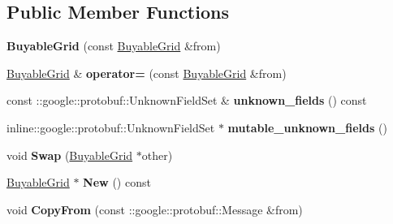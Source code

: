 \subsection*{Public Member Functions}
\begin{DoxyCompactItemize}
\item 
\hypertarget{classmonopoly_1_1_buyable_grid_a5460d03d099c969b65e1e1c5ed919adb}{}{\bfseries Buyable\+Grid} (const \hyperlink{classmonopoly_1_1_buyable_grid}{Buyable\+Grid} \&from)\label{classmonopoly_1_1_buyable_grid_a5460d03d099c969b65e1e1c5ed919adb}

\item 
\hypertarget{classmonopoly_1_1_buyable_grid_acb2e830d60bc5f46c25602a32eb85682}{}\hyperlink{classmonopoly_1_1_buyable_grid}{Buyable\+Grid} \& {\bfseries operator=} (const \hyperlink{classmonopoly_1_1_buyable_grid}{Buyable\+Grid} \&from)\label{classmonopoly_1_1_buyable_grid_acb2e830d60bc5f46c25602a32eb85682}

\item 
\hypertarget{classmonopoly_1_1_buyable_grid_ad5d32ce15f62c0f23b9b98f219e3bcfc}{}const \+::google\+::protobuf\+::\+Unknown\+Field\+Set \& {\bfseries unknown\+\_\+fields} () const \label{classmonopoly_1_1_buyable_grid_ad5d32ce15f62c0f23b9b98f219e3bcfc}

\item 
\hypertarget{classmonopoly_1_1_buyable_grid_a6ce1a87d506242ab796882af7fd12614}{}inline\+::google\+::protobuf\+::\+Unknown\+Field\+Set $\ast$ {\bfseries mutable\+\_\+unknown\+\_\+fields} ()\label{classmonopoly_1_1_buyable_grid_a6ce1a87d506242ab796882af7fd12614}

\item 
\hypertarget{classmonopoly_1_1_buyable_grid_aa8647443f5fc3a2a921df71e0202d374}{}void {\bfseries Swap} (\hyperlink{classmonopoly_1_1_buyable_grid}{Buyable\+Grid} $\ast$other)\label{classmonopoly_1_1_buyable_grid_aa8647443f5fc3a2a921df71e0202d374}

\item 
\hypertarget{classmonopoly_1_1_buyable_grid_a450005959f73fd5f67efcac2d012ce4e}{}\hyperlink{classmonopoly_1_1_buyable_grid}{Buyable\+Grid} $\ast$ {\bfseries New} () const \label{classmonopoly_1_1_buyable_grid_a450005959f73fd5f67efcac2d012ce4e}

\item 
\hypertarget{classmonopoly_1_1_buyable_grid_a70d247dcee96997351e07955c03a9046}{}void {\bfseries Copy\+From} (const \+::google\+::protobuf\+::\+Message \&from)\label{classmonopoly_1_1_buyable_grid_a70d247dcee96997351e07955c03a9046}


\end{DoxyCompactItemize}
